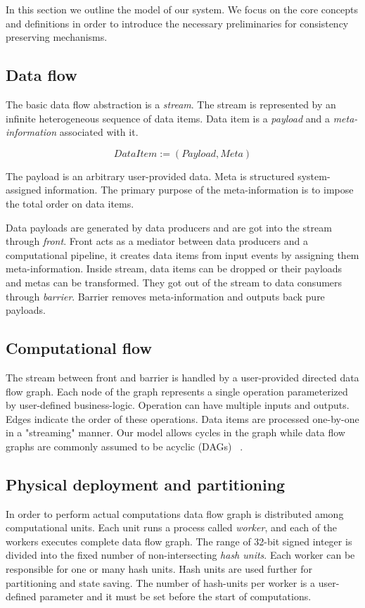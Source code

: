 
\label {fs-model-section}

In this section we outline the model of our system. We focus on the core concepts and definitions in order to introduce the necessary preliminaries for consistency preserving mechanisms.

\subsection{Data flow}
The basic data flow abstraction is a {\it stream}. The stream is represented by an infinite heterogeneous sequence of data items. Data item is a {\it payload} and a {\it meta-information} associated with it. 

\[DataItem := (Payload, Meta)\]

The payload is an arbitrary user-provided data. Meta is structured system-assigned information. The primary purpose of the meta-information is to impose the total order on data items. 

Data payloads are generated by data producers and are got into the stream through {\it front}. Front acts as a mediator between data producers and a computational pipeline, it creates data items from input events by assigning them meta-information. Inside stream, data items can be dropped or their payloads and metas can be transformed. They got out of the stream to data consumers through {\it barrier}. Barrier removes meta-information and outputs back pure payloads.

\subsection{Computational flow}
The stream between front and barrier is handled by a user-provided directed data flow graph. Each node of the graph represents a single operation parameterized by user-defined business-logic. Operation can have multiple inputs and outputs. Edges indicate the order of these operations. Data items are processed one-by-one in a "streaming" manner. Our model allows cycles in the graph while data flow graphs are commonly assumed to be acyclic (DAGs) 
~\cite{Zaharia:2016:ASU:3013530.2934664, Carbone:2017:SMA:3137765.3137777}.

\subsection{Physical deployment and partitioning}
In order to perform actual computations data flow graph is distributed among computational units. Each unit runs a process called {\it worker}, and each of the workers executes complete data flow graph. The range of 32-bit signed integer is divided into the fixed number of non-intersecting {\it hash units}. Each worker can be responsible for one or many hash units. Hash units are used further for partitioning and state saving. The number of hash-units per worker is a user-defined parameter and it must be set before the start of computations. 

